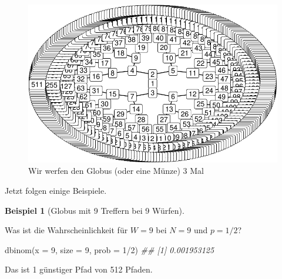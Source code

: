 \documentclass[
  a4paper,
  DIV=11]{scrreprt}
\newenvironment{Shaded}{\begin{snugshade}}{\end{snugshade}}
\newcommand{\AttributeTok}[1]{\textcolor[rgb]{0.40,0.45,0.13}{#1}}
\newcommand{\DecValTok}[1]{\textcolor[rgb]{0.68,0.00,0.00}{#1}}
\newcommand{\DocumentationTok}[1]{\textcolor[rgb]{0.37,0.37,0.37}{\textit{#1}}}
\newcommand{\FunctionTok}[1]{\textcolor[rgb]{0.28,0.35,0.67}{#1}}
\newcommand{\NormalTok}[1]{\textcolor[rgb]{0.00,0.23,0.31}{#1}}
\newcommand{\SpecialCharTok}[1]{\textcolor[rgb]{0.37,0.37,0.37}{#1}}
\theoremstyle{definition}
\newtheorem{example}{Beispiel}[chapter]
\theoremstyle{remark}
\begin{document}
\begin{figure}

{\centering \includegraphics{./Globusversuch_files/figure-pdf/fig-binom2-1.pdf}

}

\caption{\label{fig-binom2}Wir werfen den Globus (oder eine Münze) 3
Mal}

\end{figure}

Jetzt folgen einige Beispiele.

\leavevmode{}%
\begin{example}[Globus mit 9 Treffern bei 9 Würfen]\label{exm-globus2}

Was ist die Wahrscheinlichkeit für \(W=9\) bei \(N=9\) und \(p=1/2\)?

\begin{Shaded}
\begin{Highlighting}[]
\FunctionTok{dbinom}\NormalTok{(}\AttributeTok{x =} \DecValTok{9}\NormalTok{, }\AttributeTok{size =} \DecValTok{9}\NormalTok{, }\AttributeTok{prob =} \DecValTok{1}\SpecialCharTok{/}\DecValTok{2}\NormalTok{)}
\DocumentationTok{\#\# [1] 0.001953125}
\end{Highlighting}
\end{Shaded}

Das ist 1 günstiger Pfad von 512 Pfaden.

\end{example}
\end{document}
